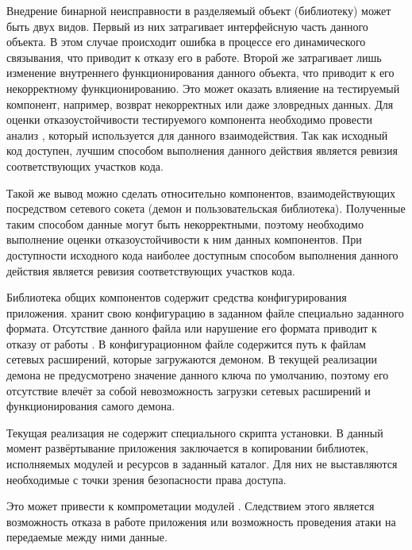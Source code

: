 %
Внедрение бинарной неисправности в разделяемый объект (библиотеку) может быть двух видов. 
%
Первый из них затрагивает интерфейсную часть данного объекта. 
%
В этом случае происходит ошибка в процессе его динамического связывания, что приводит к отказу его в работе. 
%
Второй же затрагивает лишь изменение внутреннего функционирования данного объекта, что приводит к его некорректному функционированию. 
%
Это может оказать влияение на тестируемый компонент, например, возврат некорректных или даже зловредных данных. 
%
Для оценки отказоустойчивости тестируемого компонента необходимо провести анализ , который используется для данного взаимодействия. 
%
Так как исходный код \PeerHood доступен, лучшим способом выполнения данного действия является ревизия соответствующих участков кода. 

%
Такой же вывод можно сделать относительно компонентов, взаимодействующих посредством сетевого сокета (демон и пользовательская библиотека). 
%
Полученные таким способом данные могут быть некорректными, поэтому необходимо выполнение оценки отказоустойчивости к ним данных компонентов. 
%
При доступности исходного кода \PeerHood наиболее доступным способом выполнения данного действия является ревизия соответствующих участков кода. 

%
Библиотека общих компонентов содержит средства конфигурирования приложения. 
%
\PeerHood хранит свою конфигурацию в заданном файле специально заданного формата. 
%
Отсутствие данного файла или нарушение его формата приводит к отказу от работы \PeerHood. 
%
В конфигурационном файле содержится путь к файлам сетевых расширений, которые загружаются демоном. 
%
В текущей реализации демона не предусмотрено значение данного ключа по умолчанию, поэтому его отсутствие влечёт за собой невозможность загрузки сетевых расширений и функционирования самого демона. 

%
Текущая реализация \PeerHood не содержит специального скрипта установки. 
%
В данный момент развёртывание приложения заключается в копировании библиотек, исполняемых модулей и ресурсов в заданный каталог. 
%
Для них не выставляются необходимые с точки зрения безопасности права доступа. 

%
Это может привести к компрометации модулей \PeerHood. 
%
Следствием этого является возможность отказа в работе приложения или возможность проведения атаки на передаемые между ними данные. 

